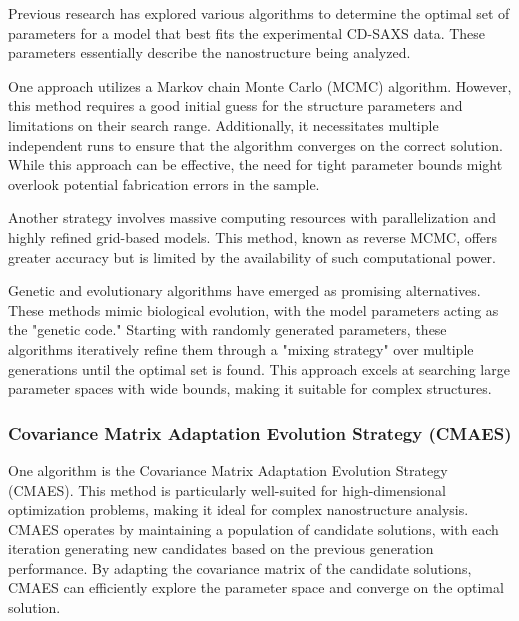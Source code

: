 \medskip

Previous research has explored various algorithms to determine the optimal set of parameters for a model that 
best fits the experimental CD-SAXS data. These parameters essentially describe the nanostructure 
being analyzed.

\medskip

One approach utilizes a Markov chain Monte Carlo (MCMC) algorithm. However, this method requires a good initial 
guess for the structure parameters and limitations on their search range. Additionally, it necessitates multiple 
independent runs to ensure that the algorithm converges on the correct solution. While this approach can be effective, 
the need for tight parameter bounds might overlook potential fabrication errors in the sample.

\medskip

Another strategy involves massive computing resources with parallelization and highly refined grid-based models. 
This method, known as reverse MCMC, offers greater accuracy but is limited by the availability of such computational power.

\medskip

Genetic and evolutionary algorithms have emerged as promising alternatives. These methods mimic biological evolution, 
with the model parameters acting as the "genetic code." Starting with randomly generated parameters, these algorithms 
iteratively refine them through a "mixing strategy" over multiple generations until the optimal set is found. This 
approach excels at searching large parameter spaces with wide bounds, making it suitable for complex structures.
\cite{hannon2016advancing}

\subsubsection{Covariance Matrix Adaptation Evolution Strategy (CMAES)}

One algorithm is the Covariance Matrix Adaptation Evolution Strategy (CMAES). This method is particularly 
well-suited for high-dimensional optimization problems, making it ideal for complex nanostructure analysis. CMAES 
operates by maintaining a population of candidate solutions, with each iteration generating new candidates based on 
the previous generation performance. By adapting the covariance matrix of the candidate solutions, CMAES can efficiently 
explore the parameter space and converge on the optimal solution.


